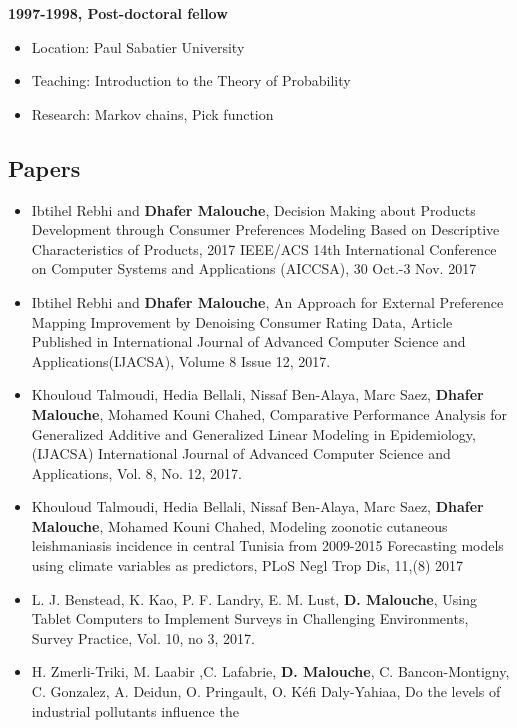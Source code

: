 \documentclass[]{article}
\begin{document}
\textbf{1997-1998, Post-doctoral fellow}

\begin{itemize}
\item
  Location: Paul Sabatier University
\item
  Teaching: Introduction to the Theory of Probability
\item
  Research: Markov chains, Pick function
\end{itemize}

\subsection{Papers}\label{papers}

\begin{itemize}
\item
  Ibtihel Rebhi and \textbf{Dhafer Malouche}, Decision Making about
  Products Development through Consumer Preferences Modeling Based on
  Descriptive Characteristics of Products, 2017 IEEE/ACS 14th
  International Conference on Computer Systems and Applications
  (AICCSA), 30 Oct.-3 Nov. 2017
\item
  Ibtihel Rebhi and \textbf{Dhafer Malouche}, An Approach for External
  Preference Mapping Improvement by Denoising Consumer Rating Data,
  Article Published in International Journal of Advanced Computer
  Science and Applications(IJACSA), Volume 8 Issue 12, 2017.
\item
  Khouloud Talmoudi, Hedia Bellali, Nissaf Ben-Alaya, Marc Saez,
  \textbf{Dhafer Malouche}, Mohamed Kouni Chahed, Comparative
  Performance Analysis for Generalized Additive and Generalized Linear
  Modeling in Epidemiology, (IJACSA) International Journal of Advanced
  Computer Science and Applications, Vol. 8, No. 12, 2017.
\item
  Khouloud Talmoudi, Hedia Bellali, Nissaf Ben-Alaya, Marc Saez,
  \textbf{Dhafer Malouche}, Mohamed Kouni Chahed, Modeling zoonotic
  cutaneous leishmaniasis incidence in central Tunisia from 2009-2015
  Forecasting models using climate variables as predictors, PLoS Negl
  Trop Dis, 11,(8) 2017
\item
  L. J. Benstead, K. Kao, P. F. Landry, E. M. Lust, \textbf{D.
  Malouche}, Using Tablet Computers to Implement Surveys in Challenging
  Environments, Survey Practice, Vol. 10, no 3, 2017.
\item
  H. Zmerli-Triki, M. Laabir ,C. Lafabrie, \textbf{D. Malouche}, C.
  Bancon-Montigny, C. Gonzalez, A. Deidun, O. Pringault, O. Kéfi
  Daly-Yahiaa, Do the levels of industrial pollutants influence the

\end{itemize}
\end{document}
